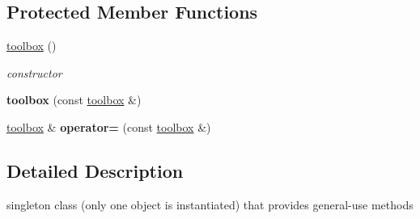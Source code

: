 \subsection*{Protected Member Functions}
\begin{DoxyCompactItemize}
\item 
\hypertarget{classtoolbox_ae52c33dc9f80c6ce0208a70abde2418e}{\hyperlink{classtoolbox_ae52c33dc9f80c6ce0208a70abde2418e}{toolbox} ()}\label{classtoolbox_ae52c33dc9f80c6ce0208a70abde2418e}

\begin{DoxyCompactList}\small\item\em constructor \end{DoxyCompactList}\item 
\hypertarget{classtoolbox_a384cba887600d141b5c19ada2448522e}{{\bfseries toolbox} (const \hyperlink{classtoolbox}{toolbox} \&)}\label{classtoolbox_a384cba887600d141b5c19ada2448522e}

\item 
\hypertarget{classtoolbox_a22f47dcb9fdf470e56c16c3851a58f7a}{\hyperlink{classtoolbox}{toolbox} \& {\bfseries operator=} (const \hyperlink{classtoolbox}{toolbox} \&)}\label{classtoolbox_a22f47dcb9fdf470e56c16c3851a58f7a}

\end{DoxyCompactItemize}


\subsection{Detailed Description}
singleton class (only one object is instantiated) that provides general-\/use methods 

